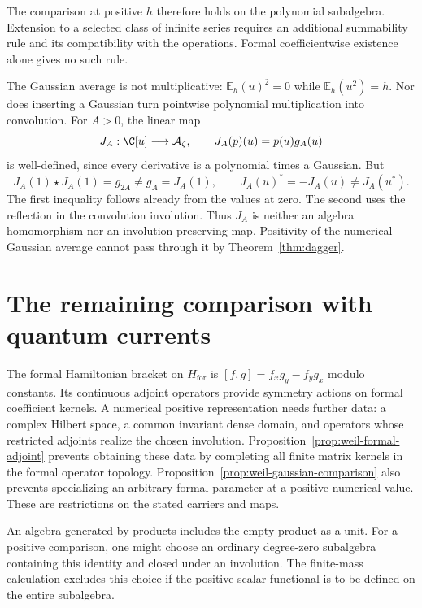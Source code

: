The comparison at positive $h$ therefore holds on the polynomial
subalgebra.  Extension to a selected class of infinite series requires
an additional summability rule and its compatibility with the operations.
Formal coefficientwise existence alone gives no such rule.

The Gaussian average is not multiplicative:
$\mathbb E_h(u)^2=0$ while $\mathbb E_h(u^2)=h$.
Nor does inserting a Gaussian turn pointwise polynomial multiplication
into convolution.  For $A>0$, the linear map
\[
 J_A:\C[u]\longrightarrow\A_\zeta,\qquad J_A(p)(u)=p(u)g_A(u)
\]
is well-defined, since every derivative is a polynomial times a Gaussian.
But
\[
 J_A(1)\star J_A(1)=g_{2A}\ne g_A=J_A(1),
 \qquad J_A(u)^*=-J_A(u)\ne J_A(u^*).
\]
The first inequality follows already from the values at zero.
The second uses the reflection in the convolution involution.
Thus $J_A$ is neither an algebra homomorphism nor an involution-preserving
map.  Positivity of the numerical Gaussian average cannot pass through
it by Theorem~\ref{thm:dagger}.

\section{The remaining comparison with quantum currents}
\label{sec:weil-current-comparison}

The formal Hamiltonian bracket on $H_{\mathrm{for}}$ is
$[f,g]=f_xg_y-f_yg_x$ modulo constants.
Its continuous adjoint operators provide symmetry actions on formal
coefficient kernels.  A numerical positive representation needs further
data: a complex Hilbert space, a common invariant dense domain, and
operators whose restricted adjoints realize the chosen involution.
Proposition~\ref{prop:weil-formal-adjoint} prevents obtaining these data
by completing all finite matrix kernels in the formal operator topology.
Proposition~\ref{prop:weil-gaussian-comparison} also prevents specializing
an arbitrary formal parameter at a positive numerical value.
These are restrictions on the stated carriers and maps.

An algebra generated by products includes the empty product as a unit.
For a positive comparison, one might choose an ordinary degree-zero
subalgebra containing this identity and closed under an involution.
The finite-mass calculation excludes this choice if the positive scalar
functional is to be defined on the entire subalgebra.

